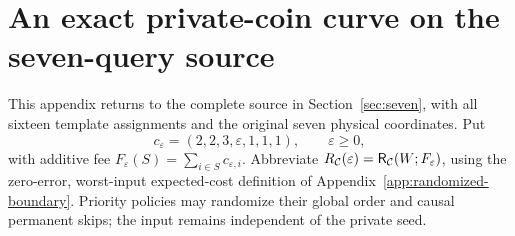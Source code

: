 \section{An exact private-coin curve on the seven-query source}
\label{app:seven-private-curve}
This appendix returns to the complete source in Section~\ref{sec:seven}, with all sixteen template assignments and the original seven physical coordinates. Put
\[
 c_\varepsilon=(2,2,3,\varepsilon,1,1,1),\qquad \varepsilon\geq0,
\]
with additive fee $F_\varepsilon(S)=\sum_{i\in S}c_{\varepsilon,i}$. Abbreviate $R_{\mathcal C}(\varepsilon)=\mathsf{R}_{\mathcal C}(W;F_\varepsilon)$, using the zero-error, worst-input expected-cost definition of Appendix~\ref{app:randomized-boundary}. Priority policies may randomize their global order and causal permanent skips; the input remains independent of the private seed.

